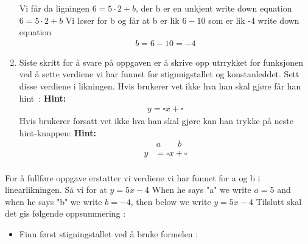 \documentclass[12pt,twoside,onecolumn]{article}
\begin{document}
\begin{Exercise}
\begin{enumerate}
\begin{figure}[h!]
\end{figure}
{\color{gray} Vi får da ligningen $6=5\cdot 2+b$, der b er en unkjent} \newline
{\color{PineGreen} write down equation 
\newline
$6=5\cdot 2+b$}
\newline
{\color{gray} Vi løser for b og får at b er lik $6-10$ som er lik -4}
\newline
{\color{PineGreen} write down equation
\begin{align}
b=6-10=-4
\end{align}}

\item Siste skritt for å svare på oppgaven er å skrive opp utrrykket for funksjonen ved å sette verdiene vi har funnet for stignnigstallet og konstanleddet.
\newline
Sett disse verdiene i likningen.
\newline
{\color{Maroon} Hvis brukerer vet ikke hva han skal gjøre får han \mbox{hint :}} 
\newline
\newline
\textbf{Hint:}
\begin{align}
y = \square x + \square
\end{align}
{\color{Maroon} Hvis brukerer forsatt vet ikke hva han skal gjøre kan han trykke på neste hint-knappen:}
\newline
\newline
\textbf{Hint:}
\begin{align}
  &\, a \qquad b\\ 
y &= \square x + \square\\
\end{align}
\end{enumerate}
{\color{gray}For å fullføre oppgave erstatter vi verdiene vi har funnet for a og b i linearlikningen. Så vi for at $y=5x-4$}
\newline
{\color{PineGreen} When he says "a" we write $a=5$ and when he says "b" we write $b=-4$, then below we write $y=5x-4$} 
\newline
\newline
{\color{Maroon}Tilslutt skal det gis følgende oppsummering :}
\begin{itemize}
\item Finn først stigningstallet ved å bruke formelen :
\begin{align}

\end{align}
\end{itemize}
\end{Exercise}
\end{document}
